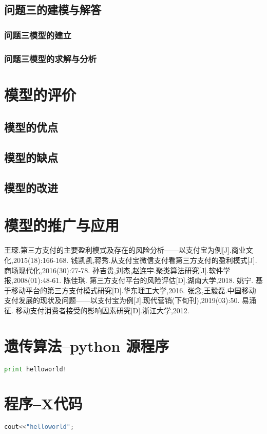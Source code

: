 \documentclass[withoutpreface,bwprint]{cumcmthesis} %
\begin{document}
\subsection{问题三的建模与解答}

\subsubsection{问题三模型的建立}


\subsubsection{问题三模型的求解与分析}


\section{模型的评价}
\subsection{模型的优点}
\subsection{模型的缺点}
\subsection{模型的改进}
\section{模型的推广与应用}


\begin{thebibliography}{9}%
  王琛.第三方支付的主要盈利模式及存在的风险分析——以支付宝为例[J].商业文化,2015(18):166-168.
 钱凯凯,蒋秀.从支付宝微信支付看第三方支付的盈利模式[J].商场现代化,2016(30):77-78.
 孙吉贵,刘杰,赵连宇.聚类算法研究[J].软件学报,2008(01):48-61.
 陈佳琪. 第三方支付平台的风险评估[D].湖南大学,2018.
 姚宁. 基于移动平台的第三方支付模式研究[D].华东理工大学,2016.
 张念,王毅磊.中国移动支付发展的现状及问题——以支付宝为例[J].现代营销(下旬刊),2019(03):50.
 易涌征. 移动支付消费者接受的影响因素研究[D].浙江大学,2012.
 
\end{thebibliography}

\newpage
\begin{appendices}
\section{遗传算法--python 源程序}
\begin{lstlisting}[language=python]
print helloworld!
 \end{lstlisting}
 \section{程序--X代码}
\begin{lstlisting}[language=c]
cout<<"helloworld";
 \end{lstlisting}
\end{appendices}
\end{document}
